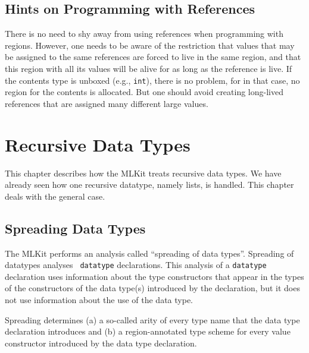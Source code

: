 \documentclass[12pt]{book}
\begin{document}
\section{Hints on Programming  with References}
There is no need to shy away from using references when programming
with regions. However, one needs to be aware of the restriction that
values that may be assigned to the same references are forced to live
in the same region, and that this region with all its values will be
alive for as long as the reference is live. If the contents type is
unboxed (e.g., {\tt int}), there is no problem, for in that case, no
region for the contents is allocated. But one should avoid creating
long-lived references that are assigned many different large values.

\chapter{Recursive Data Types}
\label{datatypes.sec}
This chapter describes how the MLKit treats recursive data types. We
have already seen how one recursive datatype, namely lists, is
handled. This chapter deals with the general case.

\section{Spreading Data Types}
The MLKit performs an analysis called
%
``spreading of data types''.  Spreading of datatypes analyses {\tt
  datatype} declarations.  This analysis of a {\tt datatype}
declaration uses information about the type constructors that appear
in the types of the constructors of the data type(s) introduced by the
declaration, but it does not use information about the use of the data
type.

Spreading determines (a) a so-called
%
arity of every type name that the data type declaration introduces and
(b) a region-annotated type scheme for every value constructor
introduced by the data type declaration.
\end{document}
